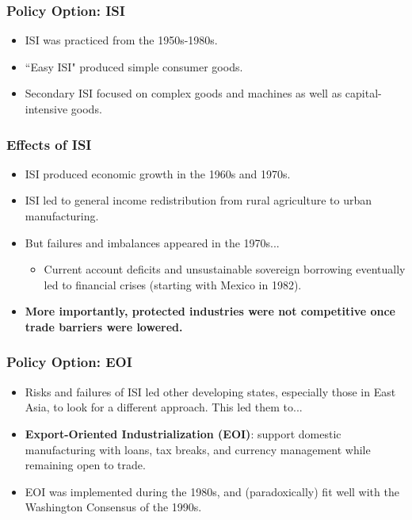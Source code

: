 \documentclass{beamer}
\begin{document}
\begin{frame} 
	\frametitle{\LARGE{Policy Option: ISI}}
	\begin{itemize}
		\item ISI was practiced from the 1950s-1980s. \pause
		\item ``Easy ISI" produced simple consumer goods.
		\item Secondary ISI focused on complex goods and machines as well as capital-intensive goods. \pause
		
	\end{itemize}
\end{frame}

\begin{frame} 
	\frametitle{\LARGE{Effects of ISI}}
	\begin{itemize}
		\item ISI produced economic growth in the 1960s and 1970s. \pause
		\item ISI led to general income redistribution from rural agriculture to urban manufacturing. \pause
		\item But failures and imbalances appeared in the 1970s... \pause
		\begin{itemize}
			\item Current account deficits and unsustainable sovereign borrowing eventually led to financial crises (starting with Mexico in 1982).
		\end{itemize}
		\item \textbf{More importantly, protected industries were not competitive once trade barriers were lowered.}
	\end{itemize}
\end{frame}


\begin{frame} 
	\frametitle{\LARGE{Policy Option: EOI}}
	\begin{itemize}
			\item Risks and failures of ISI led other developing states, especially those in East Asia, to look for a different approach. This led them to...
			\item \textbf{Export-Oriented Industrialization (EOI)}: support domestic manufacturing with loans, tax breaks, and currency management while remaining open to trade.  \pause 
			\item EOI was implemented during the 1980s, and (paradoxically) fit well with the Washington Consensus of the 1990s.
	\end{itemize}
\end{frame}
\end{document}
